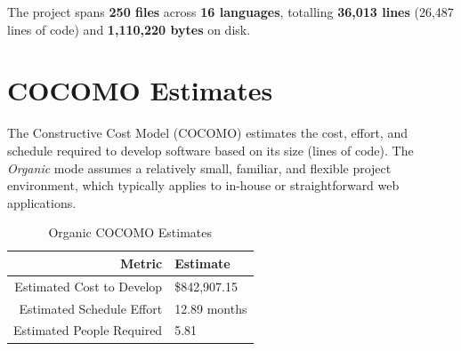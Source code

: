 \noindent
The project spans \textbf{250 files} across \textbf{16 languages}, totalling \textbf{36,013 lines} (26,487 lines of code) and \textbf{1,110,220 bytes} on disk. \\

\section{COCOMO Estimates}
The Constructive Cost Model (COCOMO) estimates the cost, effort, and schedule required to develop software based on its size (lines of code). The \textit{Organic} mode assumes a relatively small, familiar, and flexible project environment, which typically applies to in-house or straightforward web applications.
\begin{table}[H]
  \centering
  \caption{Organic COCOMO Estimates}
  \label{tab:scc-cocomo}
  \begin{tabular}{|r|l|}
    \hline
    \textbf{Metric} & \textbf{Estimate} \\
    \hline
    Estimated Cost to Develop & \$842,907.15 \\\hline
    Estimated Schedule Effort & 12.89 months \\\hline
    Estimated People Required & 5.81 \\
    \hline
  \end{tabular}
\end{table}
